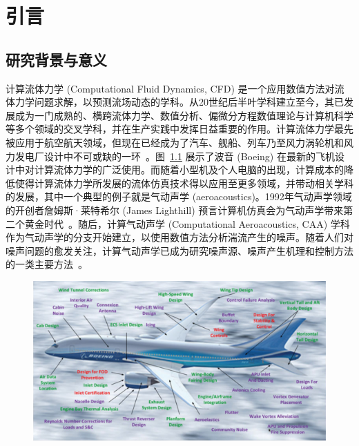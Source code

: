 \chapter{引言}
\label{chap:introduction}

\section{研究背景与意义}
\label{sec:background}
计算流体力学 (Computational Fluid Dynamics, CFD) 是一个应用数值方法对流体力学问题求解，以预测流场动态的学科。从20世纪后半叶学科建立至今，其已发展成为一门成熟的、横跨流体力学、数值分析、偏微分方程数值理论与计算机科学等多个领域的交叉学科，并在生产实践中发挥日益重要的作用。计算流体力学最先被应用于航空航天领域，但现在已经成为了汽车、舰船、列车乃至风力涡轮机和风力发电厂设计中不可或缺的一环~\citep{https://doi.org/10.1002/we.458}。图~\ref{img:cfd_impact_on_planes} 展示了波音 (Boeing) 在最新的飞机设计中对计算流体力学的广泛使用。而随着小型机及个人电脑的出现，计算成本的降低使得计算流体力学所发展的流体仿真技术得以应用至更多领域，并带动相关学科的发展，其中一个典型的例子就是气动声学 (aeroacoustics)。1992年气动声学领域的开创者詹姆斯·莱特希尔 (James Lighthill) 预言计算机仿真会为气动声学带来第二个黄金时代~\citep{hardin1993computational}。随后，计算气动声学 (Computational Aeroacoustics, CAA) 学科作为气动声学的分支开始建立，以使用数值方法分析湍流产生的噪声。随着人们对噪声问题的愈发关注，计算气动声学已成为研究噪声源、噪声产生机理和控制方法的一类主要方法~\citep{RN177}。

\begin{figure}[htbp]
    \centering
      \includegraphics[width=0.99\columnwidth]{figures/cfd_impact_on_planes.png}
    \label{img:cfd_impact_on_planes}
\end{figure}

